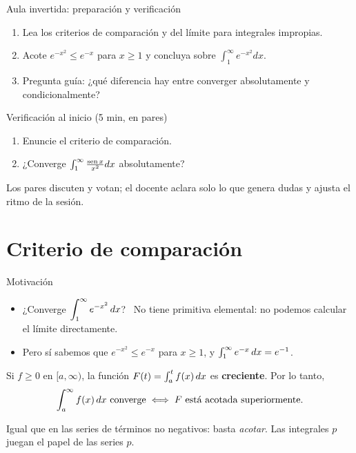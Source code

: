 \documentclass[10pt,aspectratio=169]{beamer}
\begin{document}
\begin{frame}{Aula invertida: preparación y verificación}
  \small
  \begin{previa}
    \begin{enumerate}
      \item Lea los criterios de comparación y del límite para integrales impropias.
      \item Acote $e^{-x^2}\le e^{-x}$ para $x\ge1$ y concluya sobre $\int_1^\infty e^{-x^2}dx$.
      \item Pregunta guía: ¿qué diferencia hay entre converger absolutamente y condicionalmente?
    \end{enumerate}
  \end{previa}
  \begin{block}{Verificación al inicio (5 min, en pares)}
    \begin{enumerate}
      \item Enuncie el criterio de comparación.
      \item ¿Converge $\int_1^\infty\frac{\operatorname{sen} x}{x^2}dx$ absolutamente?
    \end{enumerate}
    Los pares discuten y votan; el docente aclara solo lo que genera dudas y ajusta el ritmo de la sesión.
  \end{block}
\end{frame}

\section{Criterio de comparación}

\begin{frame}{Motivación}
  \begin{itemize}
    \item ¿Converge $\displaystyle\int_1^\infty e^{-x^2}\,dx$? \ No tiene primitiva elemental: no podemos calcular el límite directamente.
    \item Pero sí sabemos que $e^{-x^2}\le e^{-x}$ para $x\ge1$, y $\int_1^\infty e^{-x}\,dx=e^{-1}$.
  \end{itemize}
  \begin{proposicion}
    Si $f\ge0$ en $[a,\infty)$, la función $F(t)=\int_a^tf(x)\,dx$ es \textbf{creciente}. Por lo tanto,
    \[ \int_a^\infty f(x)\dx\ \text{converge}\iff F\ \text{está acotada superiormente}. \]
  \end{proposicion}
  \begin{idea}
    Igual que en las series de términos no negativos: basta \emph{acotar}. Las integrales $p$ juegan el papel de las series $p$.
  \end{idea}
\end{frame}
\end{document}
